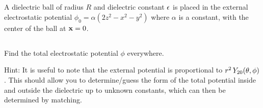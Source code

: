 \documentclass[11pt]{article}
\newenvironment{statement}[1]
{
	\section{#1}
	\color{darkgray}
	\ignorespaces
}
{
}
\newenvironment{problem}
{
	\subsection{}
	\color{darkgray}
    \ignorespaces
}
{

}
\begin{document}
\newcommand{\phio}{\phi_0}
\newcommand{\alp}{\alpha}
\newcommand{\cE}{\mathcal{E}}
\newcommand{\cEint}{\cE_\text{int}}
\newcommand{\rhof}{\rho_f}
\newcommand{\evphi}{\ev{\phi}}
\newcommand{\evrhof}{\ev{\rhof}}
\newcommand{\vP}{\vb{P}}
\newcommand{\evvP}{\ev{\vP}}
\newcommand{\divP}{\div{\evvP}}
\newcommand{\lap}{\laplacian}

\newcommand{\Alm}{A_{l m}}
\newcommand{\Blm}{B_{l m}}
\newcommand{\tif}{\text{if }}
\newcommand{\nh}{\vb{\hat{n}}}
\newcommand{\vE}{\vb{E}}
\newcommand{\evE}{\ev{\vE}}
\newcommand{\evEr}{\ev{E_r}}
\newcommand{\vD}{\vb{D}}
\newcommand{\evD}{\ev{\vD}}
\newcommand{\tfor}{\quad \text{for }}

\begin{statement}{}
	A dielectric ball of radius $R$ and dielectric constant $\epsilon$ is placed in the external electrostatic potential $\phio = \alp (2z^2 - x^2 - y^2)$ where $\alp$ is a constant, with the center of the ball at $\vb{x} = 0$.
\end{statement}

\begin{problem}
	Find the total electrostatic potential $\phi$ everywhere.
	
	Hint: It is useful to note that the external potential is proportional to $r^2 \, Y_{2 0}(\theta, \phi)$.  This should allow you to determine/guess the form of the total potential inside and outside the dielectric up to unknown constants, which can then be determined by matching.
\end{problem}
\end{document}

